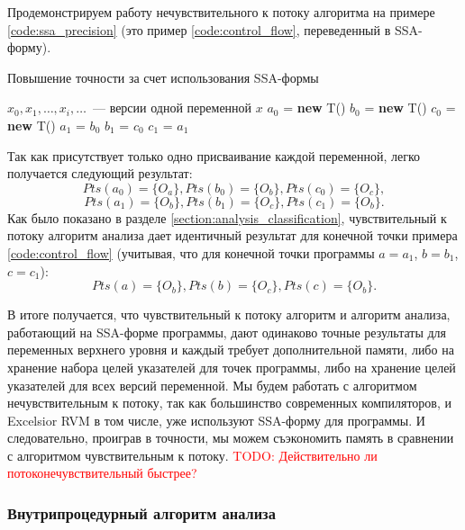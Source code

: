 \documentclass[14pt,titlepage]{extarticle}
\newcommand{\NEW}{\textbf{new }}
\newcommand{\todo}[1]{\textcolor{red}{\eng{TODO}: #1}}
\newcommand{\eng}[1]{{\English#1}}
\begin{document}
        Продемонстрируем работу нечувствительного к потоку алгоритма на примере
        \ref{code:ssa_precision} (это пример \ref{code:control_flow},
        переведенный в SSA-форму).
        \begin{algorithm}
          \caption{Повышение точности за счет использования SSA-формы}
          \label{code:ssa_precision}
          \begin{algorithmic}[1]
            \REQUIRE $x_0, x_1, \ldots, x_i, \ldots$~--- версии одной переменной $x$
            \STATE $a_0$ = \NEW T()
            \STATE $b_0$ = \NEW T()
            \STATE $c_0$ = \NEW T()
            \STATE $a_1$ = $b_0$
            \STATE $b_1$ = $c_0$
            \STATE $c_1$ = $a_1$
          \end{algorithmic}
        \end{algorithm}

        Так как присутствует только одно присваивание каждой переменной, легко
        получается следующий результат:
        \[Pts(a_0) = \{O_a\}, Pts(b_0) = \{O_b\}, Pts(c_0) = \{O_c\},\]
        \[Pts(a_1) = \{O_b\}, Pts(b_1) = \{O_c\}, Pts(c_1) = \{O_b\}.\]
        Как было показано в разделе \ref{section:analysis_classification},
        чувствительный к
        потоку алгоритм анализа дает идентичный результат для конечной точки
        примера \ref{code:control_flow} (учитывая, что для конечной точки
        программы $a = a_1$, $b = b_1$, $c = c_1$):
        \[Pts(a) = \{O_b\}, Pts(b) = \{O_c\}, Pts(c) = \{O_b\}.\]

        В итоге получается, что чувствительный к потоку алгоритм и алгоритм
        анализа, работающий на SSA-форме программы, дают одинаково точные
        результаты для переменных верхнего уровня и каждый требует
        дополнительной памяти, либо на хранение набора целей указателей для
        точек программы, либо на хранение целей указателей для всех версий
        переменной.
        Мы будем работать с алгоритмом нечувствительным к потоку, так как
        большинство современных компиляторов, и \eng{Excelsior RVM} в том числе,
        уже используют SSA-форму для программы. И следовательно, проиграв в
        точности, мы можем съэкономить память в сравнении с алгоритмом
        чувствительным к потоку.
        \todo{Действительно ли потоконечувствительный быстрее?}

      \subsubsection{Внутрипроцедурный алгоритм анализа}
\end{document}
